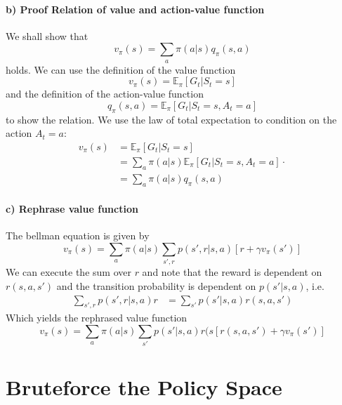 \documentclass{article}
\begin{document}
\paragraph*{b) Proof Relation of value and action-value function}

We shall show that 
\begin{equation}
    v_\pi(s) = \sum_a \pi(a|s) q_\pi(s,a)
\end{equation}
holds. We can use the definition of the value function
\begin{equation}
    v_\pi(s) = \mathbb{E}_\pi[G_t | S_t = s]
\end{equation}
and the definition of the action-value function
\begin{equation}
    q_\pi(s,a) = \mathbb{E}_\pi[G_t | S_t = s, A_t = a]
\end{equation}
to show the relation. We use the law of total expectation to condition on the action $A_t = a$:
\begin{align}
    v_\pi(s) &= \mathbb{E}_\pi[G_t | S_t = s] \\
       &= \sum_a \pi(a|s) \mathbb{E}_\pi[G_t | S_t = s, A_t = a] \cdot \\
       &= \sum_a \pi(a|s) q_\pi(s,a)
\end{align}


\paragraph*{c) Rephrase value function}

The bellman equation is given by
\begin{equation}
    v_\pi(s) = \sum_a \pi(a|s) \sum_{s',r} p(s',r|s,a) [r + \gamma v_\pi(s')]
\end{equation}
We can execute the sum over $r$ and note that the reward is dependent on $r(s, a, s')$ and the transition probability is dependent on $p(s'|s,a)$, i.e.
\begin{align}
    \sum_{s',r} p(s',r|s,a) r &= \sum_{s'} p(s'|s,a) r(s, a, s')
\end{align}
Which yields the rephrased value function
\begin{equation}
    v_\pi(s) = \sum_a \pi(a|s) \sum_{s'} p(s'|s,a) r(s[r(s, a, s') + \gamma v_\pi(s')]
\end{equation}



\section{Bruteforce the Policy Space}
\end{document}
